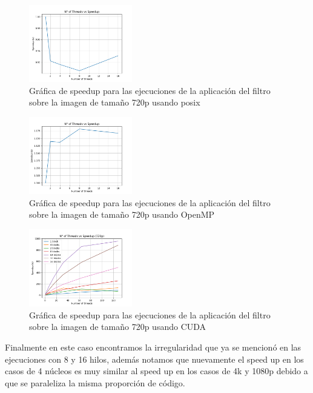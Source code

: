 \begin{figure}[H]
    \centering
    \includegraphics[width=0.4\textwidth]{../plots/720p_speedup.png}
    \caption{Gráfica de speedup para las ejecuciones de la aplicación del filtro sobre la imagen de tamaño 720p usando posix}
\end{figure}

\begin{figure}[H]
    \centering
    \includegraphics[width=0.4\textwidth]{../plots/omp_720p_speedup.png}
    \caption{Gráfica de speedup para las ejecuciones de la aplicación del filtro sobre la imagen de tamaño 720p usando OpenMP}
\end{figure}

\begin{figure}[H]
    \centering
    \includegraphics[width=0.4\textwidth]{../plots/cuda_720p_speedup.png}
    \caption{Gráfica de speedup para las ejecuciones de la aplicación del filtro sobre la imagen de tamaño 720p usando CUDA}
\end{figure}

Finalmente en este caso encontramos la irregularidad que ya se mencionó en las ejecuciones con 8 y 16 hilos, además notamos que nuevamente el speed up en los casos de 4 núcleos es muy similar al speed up en los casos de 4k y 1080p debido a que se paraleliza la misma proporción de código.

